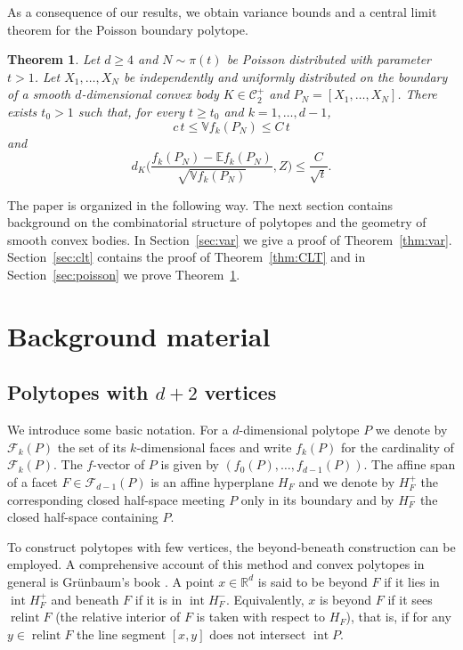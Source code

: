 \documentclass[12pt]{article}
\newcommand{\IR}{\mathds{R}}
\DeclareMathOperator{\Int}{int}
\DeclareMathOperator{\relint}{relint}
\def\E{{\mathds E}}
\def\V{{\mathds V}}
\def\cC{{\mathcal C}}
\def\cF{{\mathcal F}}
\newtheorem{theorem}{Theorem}[section]
\theoremstyle{definition}
\begin{document}
As a consequence of our results, we obtain variance bounds and a central limit theorem for the Poisson boundary polytope. 

\begin{theorem}\label{thm:poisson}
Let $d\ge 4$ and $N\sim\pi(t)$ be Poisson distributed with parameter $t>1$. Let $X_1,\dots,X_N$ be independently and uniformly distributed on the boundary of a smooth $d$-dimensional convex body $K\in \cC_{2}^+$ and $P_N=[X_1,\dots,X_N]$. There exists $t_0>1$ such that, for every $t\ge t_0$ and $k=1,\dots,d-1$,
\begin{equation}\label{eq:Poisson-Var}
c\, t \le \V f_k(P_N)\le C\, t
\end{equation}
and 
\begin{equation}\label{eq:Poisson-CLT}
d_K \Big(\frac{f_k(P_N)-\E f_k(P_N)}{\sqrt{\V f_k(P_N)}},Z\Big)\le \frac{C}{\sqrt{t}} .
\end{equation}
\end{theorem}

\bigskip

The paper is organized in the following way. The next section contains background on the combinatorial structure of polytopes and the geometry of smooth convex bodies. In Section~\ref{sec:var} we give a proof of Theorem~\ref{thm:var}. Section~\ref{sec:clt} contains the proof of Theorem~\ref{thm:CLT} and in Section~\ref{sec:poisson} we prove Theorem~\ref{thm:poisson}.

\section{Background material}\label{sec:prelim}

\subsection{Polytopes with {$d+2$} vertices} \label{sec:polytope}

We introduce some basic notation. For a $d$-dimensional polytope $P$ we denote by $\cF_k(P)$ the set of its $k$-dimensional faces and write $f_k(P)$ for the cardinality of $\cF_k(P)$. The $f$-vector of $P$ is given by $(f_0(P),\dots,f_{d-1}(P))$. The affine span of a facet $F\in \cF_{d-1}(P)$ is an affine hyperplane $H_F$ and we denote by $H_F^+$ the corresponding closed half-space meeting $P$ only in its boundary and by $H_F^-$ the closed half-space containing $P$. 

To construct polytopes with few vertices, the beyond-beneath construction can be employed. A comprehensive account of this method and convex polytopes in general is Grünbaum's book \cite{Gruenbaum}. A point $x\in \IR^d$ is said to be beyond $F$ if it lies in $\Int H_F^+$ and beneath $F$ if it is in $\Int H_F^-$. Equivalently, $x$ is beyond $F$ if it sees $\relint F$ (the relative interior of $F$ is taken with respect to $H_F$), that is, if for any $y\in \relint F$ the line segment $[x,y]$ does not intersect $\Int P$.
\end{document}
